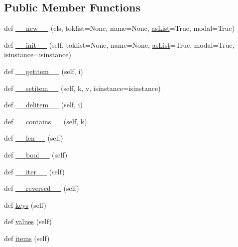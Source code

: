 \subsection*{Public Member Functions}
\begin{DoxyCompactItemize}
\item 
def \hyperlink{classpyparsing_1_1ParseResults_af3a9fb93af5de086899def575d029fec}{\+\_\+\+\_\+new\+\_\+\+\_\+} (cls, toklist=None, name=None, \hyperlink{classpyparsing_1_1ParseResults_a5c0bd2157d26ad4c82e2626f87d24962}{as\+List}=True, modal=True)
\item 
def \hyperlink{classpyparsing_1_1ParseResults_aab2739eb471f9a028b6600b3459ce87e}{\+\_\+\+\_\+init\+\_\+\+\_\+} (self, toklist=None, name=None, \hyperlink{classpyparsing_1_1ParseResults_a5c0bd2157d26ad4c82e2626f87d24962}{as\+List}=True, modal=True, isinstance=isinstance)
\item 
def \hyperlink{classpyparsing_1_1ParseResults_a0adb22b23f6f814b8fd1c913f27c627c}{\+\_\+\+\_\+getitem\+\_\+\+\_\+} (self, i)
\item 
def \hyperlink{classpyparsing_1_1ParseResults_a3eb0c21ddd50238a7c811803c0e21b6a}{\+\_\+\+\_\+setitem\+\_\+\+\_\+} (self, k, v, isinstance=isinstance)
\item 
def \hyperlink{classpyparsing_1_1ParseResults_a1e1c8bbbb79bbddfc8a88805b5835659}{\+\_\+\+\_\+delitem\+\_\+\+\_\+} (self, i)
\item 
def \hyperlink{classpyparsing_1_1ParseResults_a83d35501b325a2be38259cc07feb36db}{\+\_\+\+\_\+contains\+\_\+\+\_\+} (self, k)
\item 
def \hyperlink{classpyparsing_1_1ParseResults_a61df84d247bf2d50b3bd08cfb7f17151}{\+\_\+\+\_\+len\+\_\+\+\_\+} (self)
\item 
def \hyperlink{classpyparsing_1_1ParseResults_a2106ae5dcf8375304b7ab2eb376b30d3}{\+\_\+\+\_\+bool\+\_\+\+\_\+} (self)
\item 
def \hyperlink{classpyparsing_1_1ParseResults_ab588325d8d9b596652c374e74cb8d640}{\+\_\+\+\_\+iter\+\_\+\+\_\+} (self)
\item 
def \hyperlink{classpyparsing_1_1ParseResults_adb4623850c0afd2ce8fc18f38a49287f}{\+\_\+\+\_\+reversed\+\_\+\+\_\+} (self)
\item 
def \hyperlink{classpyparsing_1_1ParseResults_acf67bd0c93d4fb61c1d18df637fa1d75}{keys} (self)
\item 
def \hyperlink{classpyparsing_1_1ParseResults_ac90247e940d431ca9c975eade0a88dce}{values} (self)
\item 
def \hyperlink{classpyparsing_1_1ParseResults_a3b3a33f4261e2e499bf991288d77b050}{items} (self)

\end{DoxyCompactItemize}
